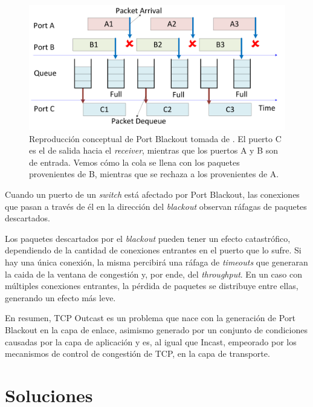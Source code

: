 \documentclass[runningheads,a4paper]{llncs}
\begin{document}
\begin{figure}[t!]
    \centering
    \includegraphics[width=1\textwidth]{figures/TCP_Outcast_Example.png}
    \caption{Reproducción conceptual de Port Blackout tomada de \cite{Prakash_Outcast_2012}. El puerto C es el de salida hacia el \textit{receiver}, mientras que los puertos A y B son de entrada. Vemos cómo la cola se llena con los paquetes provenientes de B, mientras que se rechaza a los provenientes de A.}
    \label{fig:port_blackout_example}
\end{figure}

Cuando un puerto de un \textit{switch} está afectado por Port Blackout, las conexiones que pasan a través de él en la dirección del \textit{blackout} observan ráfagas de paquetes descartados.

Los paquetes descartados por el \textit{blackout} pueden tener un efecto catastrófico, dependiendo de la cantidad de conexiones entrantes en el puerto que lo sufre. Si hay una única conexión, la misma percibirá una ráfaga de \textit{timeouts} que generaran la caida de la ventana de congestión y, por ende, del \textit{throughput}. En un caso con múltiples conexiones entrantes, la pérdida de paquetes se distribuye entre ellas, generando un efecto más leve.

En resumen, TCP Outcast es un problema que nace con la generación de Port Blackout en la capa de enlace, asimismo generado por un conjunto de condiciones causadas por la capa de aplicación y es, al igual que Incast, empeorado por los mecanismos de control de congestión de TCP, en la capa de transporte.

\section{Soluciones} \label{solutions}

\end{document}
